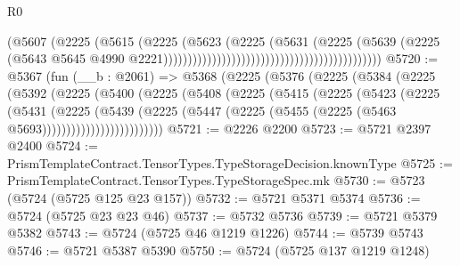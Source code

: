 \begin{lexlean}{R0}
\begin{coremodule}
                                                                        (@5607
                                                                          (@2225
                                                                            (@5615
                                                                              (@2225
                                                                                (@5623
                                                                                  (@2225
                                                                                    (@5631
                                                                                      (@2225
                                                                                        (@5639
                                                                                          (@2225
                                                                                            (@5643
                                                                                              @5645
                                                                                              @4990
                                                                                              @2221)))))))))))))))))))))))))))))))))))))))))))))
@5720 := @5367
    (fun (__b : @2061) =>
    @5368
      (@2225
        (@5376
          (@2225
            (@5384
              (@2225
                (@5392
                  (@2225
                    (@5400
                      (@2225
                        (@5408
                          (@2225
                            (@5415
                              (@2225
                                (@5423
                                  (@2225
                                    (@5431
                                      (@2225
                                        (@5439
                                          (@2225
                                            (@5447
                                              (@2225
                                                (@5455 (@2225 (@5463 @5693)))))))))))))))))))))))))
@5721 := @2226 @2200
@5723 := @5721 @2397 @2400
@5724 := PrismTemplateContract.TensorTypes.TypeStorageDecision.knownType
@5725 := PrismTemplateContract.TensorTypes.TypeStorageSpec.mk
@5730 := @5723 (@5724 (@5725 @125 @23 @157))
@5732 := @5721 @5371 @5374
@5736 := @5724 (@5725 @23 @23 @46)
@5737 := @5732 @5736
@5739 := @5721 @5379 @5382
@5743 := @5724 (@5725 @46 @1219 @1226)
@5744 := @5739 @5743
@5746 := @5721 @5387 @5390
@5750 := @5724 (@5725 @137 @1219 @1248)

\end{coremodule}
\end{lexlean}

